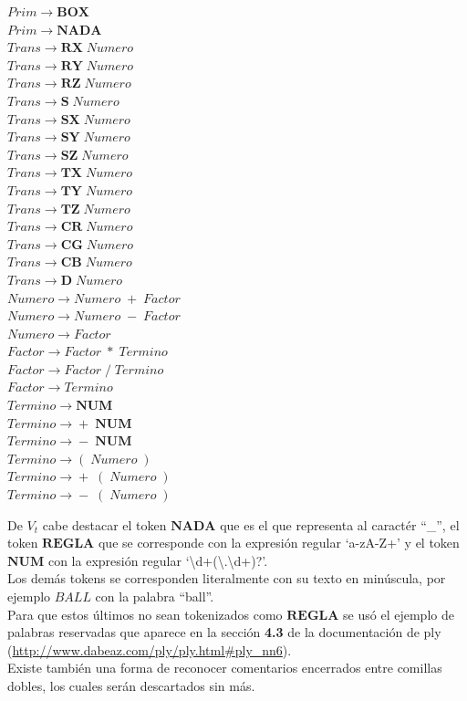 \documentclass[10pt,a4paper]{article}
\begin{document}
\begin{itemize}
$Prim\rightarrow{}\textbf{BOX}$\\
$Prim\rightarrow{}\textbf{NADA}$\\
$Trans\rightarrow{}\textbf{RX}\;Numero$\\
$Trans\rightarrow{}\textbf{RY}\;Numero$\\
$Trans\rightarrow{}\textbf{RZ}\;Numero$\\
$Trans\rightarrow{}\textbf{S}\;Numero$\\
$Trans\rightarrow{}\textbf{SX}\;Numero$\\
$Trans\rightarrow{}\textbf{SY}\;Numero$\\
$Trans\rightarrow{}\textbf{SZ}\;Numero$\\
$Trans\rightarrow{}\textbf{TX}\;Numero$\\
$Trans\rightarrow{}\textbf{TY}\;Numero$\\
$Trans\rightarrow{}\textbf{TZ}\;Numero$\\
$Trans\rightarrow{}\textbf{CR}\;Numero$\\
$Trans\rightarrow{}\textbf{CG}\;Numero$\\
$Trans\rightarrow{}\textbf{CB}\;Numero$\\
$Trans\rightarrow{}\textbf{D}\;Numero$\\
$Numero\rightarrow{}Numero\;+\;Factor$\\
$Numero\rightarrow{}Numero\;-\;Factor$\\
$Numero\rightarrow{}Factor$\\
$Factor\rightarrow{}Factor\;*\;Termino$\\
$Factor\rightarrow{}Factor\;/\;Termino$\\
$Factor\rightarrow{}Termino$\\
$Termino\rightarrow{}\textbf{NUM}$\\
$Termino\rightarrow{}+\;\textbf{NUM}$\\
$Termino\rightarrow{}-\;\textbf{NUM}$\\
$Termino\rightarrow{}(\;Numero\;)$\\
$Termino\rightarrow{}+\;(\;Numero\;)$\\
$Termino\rightarrow{}-\;(\;Numero\;)$\\
\end{itemize}
De $V_t$ cabe destacar el token $\textbf{NADA}$ que es el que representa al caractér ``\_'',  el token $\textbf{REGLA}$ que se corresponde con la expresión regular `\lbrack a-zA-Z\rbrack+' y el token $\textbf{NUM}$ con la expresión regular `\textbackslash d+(\textbackslash .\textbackslash d+)?'.\\
Los demás tokens se corresponden literalmente con su texto en minúscula, por ejemplo $BALL$ con la palabra ``ball''.\\
Para que estos últimos no sean tokenizados como $\textbf{REGLA}$ se usó el ejemplo de palabras reservadas que aparece en la sección \textbf{4.3} de la documentación de ply (\url{http://www.dabeaz.com/ply/ply.html#ply_nn6}).\\
Existe también una forma de reconocer comentarios encerrados entre comillas dobles, los cuales serán descartados sin más.
\end{document}
